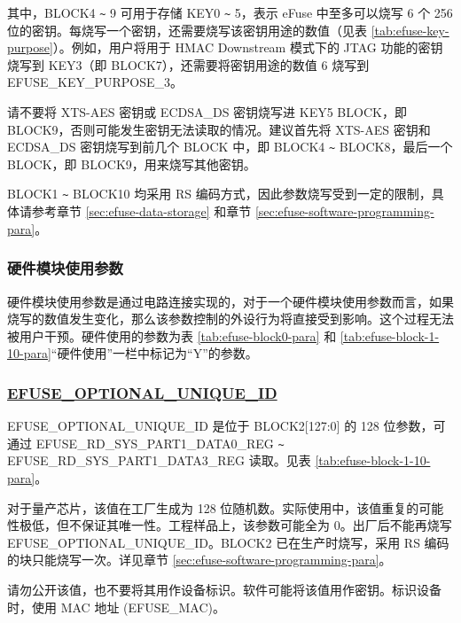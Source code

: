 \documentclass[main\_\_CN.tex]{subfiles}
\begin{document}


其中，BLOCK4 \verb+~+ 9 可用于存储 KEY0 \verb+~+ 5，表示 eFuse 中至多可以烧写 6 个 256 位的密钥。每烧写一个密钥，还需要烧写该密钥用途的数值（见表 \ref{tab:efuse-key-purpose}）。例如，用户将用于 HMAC Downstream 模式下的 JTAG 功能的密钥烧写到 KEY\textcolor{myred}{3}（即 BLOCK7），还需要将密钥用途的数值 6 烧写到 EFUSE\_KEY\_PURPOSE\_\textcolor{myred}{3}。

\begin{tiplisting}
请不要将 XTS-AES 密钥或 ECDSA\_DS 密钥烧写进 KEY5 BLOCK，即 BLOCK9，否则可能发生密钥无法读取的情况。建议首先将 XTS-AES 密钥和 ECDSA\_DS 密钥烧写到前几个 BLOCK 中，即 BLOCK4 \verb+~+ BLOCK8，最后一个 BLOCK，即 BLOCK9，用来烧写其他密钥。
\end{tiplisting}

BLOCK1 \verb+~+ BLOCK10 均采用 RS 编码方式，因此参数烧写受到一定的限制，具体请参考章节 \ref{sec:efuse-data-storage} 和章节 \ref{sec:efuse-software-programming-para}。

\subsubsection{硬件模块使用参数}
\label{sec:para-hw-modules}

硬件模块使用参数是通过电路连接实现的，对于一个硬件模块使用参数而言，如果烧写的数值发生变化，那么该参数控制的外设行为将直接受到影响。这个过程无法被用户干预。硬件使用的参数为表 \ref{tab:efuse-block0-para} 和 \ref{tab:efuse-block-1-10-para}“硬件使用”一栏中标记为“Y”的参数。

\subsubsection{\texorpdfstring{\hyperref[fielddesc:EFUSEOPTIONALUNIQUEID]{EFUSE\_OPTIONAL\_UNIQUE\_ID}}{EFUSE\_OPTIONAL\_UNIQUE\_ID}}
\label{sec:efuse-optional-unique-id}

EFUSE\_OPTIONAL\_UNIQUE\_ID 是位于 BLOCK2[127:0] 的 128 位参数，可通过 EFUSE\_RD\_SYS\_PART1\_DATA0\_REG \verb+~+ EFUSE\_RD\_SYS\_PART1\_DATA3\_REG 读取。见表 \ref{tab:efuse-block-1-10-para}。

对于量产芯片，该值在工厂生成为 128 位随机数。实际使用中，该值重复的可能性极低，但不保证其唯一性。工程样品上，该参数可能全为 0。出厂后不能再烧写 EFUSE\_OPTIONAL\_UNIQUE\_ID。BLOCK2 已在生产时烧写，采用 RS 编码的块只能烧写一次。详见章节 \ref{sec:efuse-software-programming-para}。

请勿公开该值，也不要将其用作设备标识。软件可能将该值用作密钥。标识设备时，使用 MAC 地址 (EFUSE\_MAC)。
\end{document}
